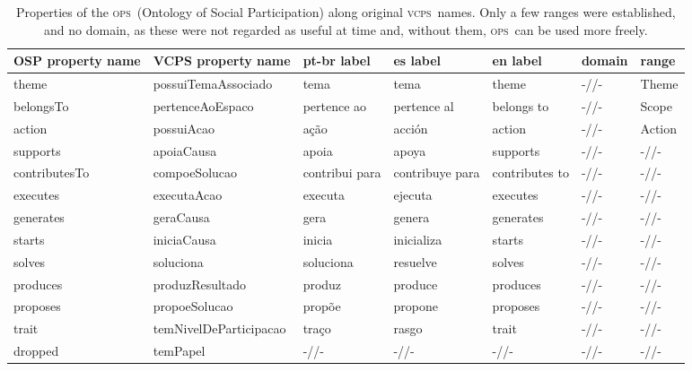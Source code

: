 \documentclass[10pt,letterpaper]{article}
\newcommand{\ops}{\textsc{ops}}
\newcommand{\vcps}{\textsc{vcps}}
\begin{document}
\begin{table}[!h]
\begin{adjustwidth}{-2.25in}{0in} %
  \caption{Properties of the \ops\ (Ontology of Social Participation) along original \vcps\ names.
  Only a few ranges were established, and no domain, as these were not regarded as useful at time and,
  without them, \ops\ can be used more freely.}
  \begin{tabular}{|l|l||p{2.2cm}|p{2.2cm}|p{1.8cm}||l|p{1.2cm}|}\hline
{\bf OSP property name} & {\bf VCPS property name} & {\bf pt-br label} & {\bf es label} & {\bf en label} & {\bf domain} & {\bf range} \\\hline\hline
theme & possuiTemaAssociado & tema & tema & theme & -//- & Theme \\ \hline
belongsTo & pertenceAoEspaco & pertence ao & pertence al & belongs to & -//- & Scope \\ \hline
action & possuiAcao & a\c{c}\~ao & acci\'on & action & -//- & Action \\\hline\hline
supports & apoiaCausa & apoia & apoya & supports & -//- & -//- \\ \hline
contributesTo & compoeSolucao & contribui para & contribuye para & contributes to & -//- & -//- \\ \hline
executes & executaAcao & executa & ejecuta & executes & -//- & -//- \\ \hline
generates & geraCausa & gera & genera & generates & -//- & -//- \\ \hline
starts & iniciaCausa & inicia & inicializa & starts & -//- & -//- \\ \hline
solves & soluciona & soluciona & resuelve & solves & -//- & -//- \\ \hline
produces & produzResultado & produz & produce & produces & -//- & -//- \\\hline
proposes & propoeSolucao & prop\~oe & propone & proposes & -//- & -//- \\\hline
      trait & temNivelDeParticipacao & tra\c{c}o & rasgo & trait & -//- & -//- \\\hline\hline
{\color{red} dropped} & temPapel & -//-  & -//-  & -//-  & -//-  & -//- \\ \hline
  \end{tabular}
  \label{ospProps}
\end{adjustwidth}
\end{table}
\end{document}
